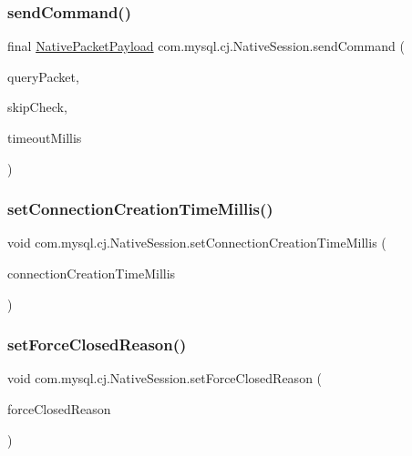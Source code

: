 \subsubsection{\texorpdfstring{send\+Command()}{sendCommand()}}
{\footnotesize\ttfamily final \mbox{\hyperlink{classcom_1_1mysql_1_1cj_1_1protocol_1_1a_1_1_native_packet_payload}{Native\+Packet\+Payload}} com.\+mysql.\+cj.\+Native\+Session.\+send\+Command (\begin{DoxyParamCaption}\item[{\mbox{\hyperlink{classcom_1_1mysql_1_1cj_1_1protocol_1_1a_1_1_native_packet_payload}{Native\+Packet\+Payload}}}]{query\+Packet,  }\item[{boolean}]{skip\+Check,  }\item[{int}]{timeout\+Millis }\end{DoxyParamCaption})}

\mbox{\label{classcom_1_1mysql_1_1cj_1_1_native_session_acdf7ae6fddc0c35f16946cbd017151f8}} 
\subsubsection{\texorpdfstring{set\+Connection\+Creation\+Time\+Millis()}{setConnectionCreationTimeMillis()}}
{\footnotesize\ttfamily void com.\+mysql.\+cj.\+Native\+Session.\+set\+Connection\+Creation\+Time\+Millis (\begin{DoxyParamCaption}\item[{long}]{connection\+Creation\+Time\+Millis }\end{DoxyParamCaption})}

\mbox{\label{classcom_1_1mysql_1_1cj_1_1_native_session_a8c13be2c7c755a6e054c1779d0f9aea9}} 
\subsubsection{\texorpdfstring{set\+Force\+Closed\+Reason()}{setForceClosedReason()}}
{\footnotesize\ttfamily void com.\+mysql.\+cj.\+Native\+Session.\+set\+Force\+Closed\+Reason (\begin{DoxyParamCaption}\item[{Throwable}]{force\+Closed\+Reason }\end{DoxyParamCaption})}

